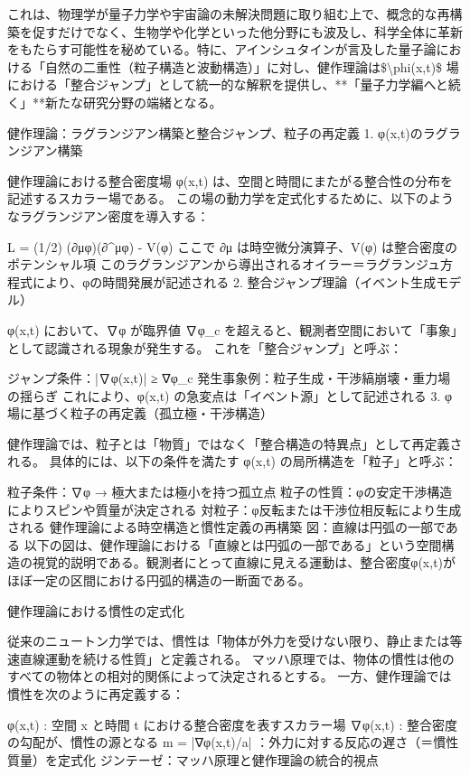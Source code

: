 \documentclass{article}
\begin{document}
これは、物理学が量子力学や宇宙論の未解決問題に取り組む上で、概念的な再構築を促すだけでなく、生物学や化学といった他分野にも波及し、科学全体に革新をもたらす可能性を秘めている。特に、アインシュタインが言及した量子論における「自然の二重性（粒子構造と波動構造）」に対し、健作理論は\$\textbackslash{}phi(x,t)\$ 場における「整合ジャンプ」として統一的な解釈を提供し、**「量子力学編へと続く」**新たな研究分野の端緒となる。


健作理論：ラグランジアン構築と整合ジャンプ、粒子の再定義
1. φ(x,t)のラグランジアン構築

健作理論における整合密度場 φ(x,t) は、空間と時間にまたがる整合性の分布を記述するスカラー場である。
この場の動力学を定式化するために、以下のようなラグランジアン密度を導入する：

L = (1/2) (∂μφ)(∂\textasciicircum{}μφ) - V(φ)
ここで ∂μ は時空微分演算子、V(φ) は整合密度のポテンシャル項
このラグランジアンから導出されるオイラー＝ラグランジュ方程式により、φの時間発展が記述される
2. 整合ジャンプ理論（イベント生成モデル）

φ(x,t) において、∇φ が臨界値 ∇φ\_c を超えると、観測者空間において「事象」として認識される現象が発生する。
これを「整合ジャンプ」と呼ぶ：

ジャンプ条件：|∇φ(x,t)| ≥ ∇φ\_c
発生事象例：粒子生成・干渉縞崩壊・重力場の揺らぎ
これにより、φ(x,t) の急変点は「イベント源」として記述される
3. φ場に基づく粒子の再定義（孤立極・干渉構造）

健作理論では、粒子とは「物質」ではなく「整合構造の特異点」として再定義される。
具体的には、以下の条件を満たす φ(x,t) の局所構造を「粒子」と呼ぶ：

粒子条件：∇φ → 極大または極小を持つ孤立点
粒子の性質：φの安定干渉構造によりスピンや質量が決定される
対粒子：φ反転または干渉位相反転により生成される
健作理論による時空構造と慣性定義の再構築
図：直線は円弧の一部である
以下の図は、健作理論における「直線とは円弧の一部である」という空間構造の視覚的説明である。観測者にとって直線に見える運動は、整合密度φ(x,t)がほぼ一定の区間における円弧的構造の一断面である。



健作理論における慣性の定式化

従来のニュートン力学では、慣性は「物体が外力を受けない限り、静止または等速直線運動を続ける性質」と定義される。
マッハ原理では、物体の慣性は他のすべての物体との相対的関係によって決定されるとする。
一方、健作理論では慣性を次のように再定義する：

φ(x,t) : 空間 x と時間 t における整合密度を表すスカラー場
∇φ(x,t) : 整合密度の勾配が、慣性の源となる
m = |∇φ(x,t)/a| ：外力に対する反応の遅さ（＝慣性質量）を定式化
ジンテーゼ：マッハ原理と健作理論の統合的視点
\end{document}
